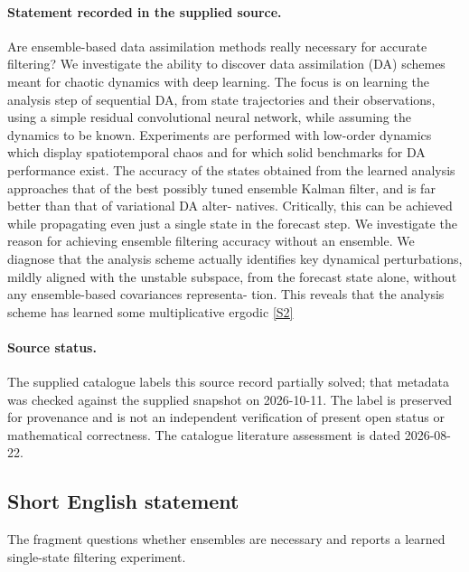 \documentclass[11pt]{article}
\newcommand{\sref}[2]{\hyperlink{source:#1:#2}{[S#2]}}
\begin{document}
\paragraph{Statement recorded in the supplied source.}
Are ensemble-based data assimilation methods really necessary for accurate filtering? We investigate the ability to discover data assimilation (DA) schemes meant for chaotic dynamics with deep learning. The focus is on learning the analysis step of sequential DA, from state trajectories and their observations, using a simple residual convolutional neural network, while assuming the dynamics to be known. Experiments are performed with low-order dynamics which display spatiotemporal chaos and for which solid benchmarks for DA performance exist. The accuracy of the states obtained from the learned analysis approaches that of the best possibly tuned ensemble Kalman filter, and is far better than that of variational DA alter- natives. Critically, this can be achieved while propagating even just a single state in the forecast step. We investigate the reason for achieving ensemble filtering accuracy without an ensemble. We diagnose that the analysis scheme actually identifies key dynamical perturbations, mildly aligned with the unstable subspace, from the forecast state alone, without any ensemble-based covariances representa- tion. This reveals that the analysis scheme has learned some multiplicative ergodic \sref{statement}{2}
\paragraph{Source status.}
The supplied catalogue labels this source record partially solved; that metadata was checked against the supplied snapshot on 2026-10-11. The label is preserved for provenance and is not an independent verification of present open status or mathematical correctness. The catalogue literature assessment is dated 2026-08-22.
\subsection{Short English statement}
The fragment questions whether ensembles are necessary and reports a learned single-state filtering experiment.
\end{document}
